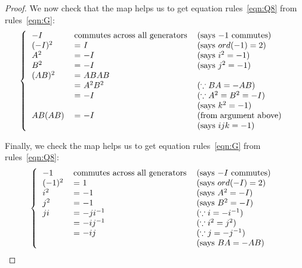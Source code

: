 \documentclass{article}
\begin{document}
\begin{enumerate}
\begin{enumerate}
\begin{proof}
          We now check that the map helps us to get equation
          rules~\ref{eqn:Q8} from rules~\ref{eqn:G}:
          \[\left \{
            \begin{tabular}{lll}
              $-I$      & commutes across all generators
                                        & (says $-1$ commutes) \\
              $(-I)^2$  & = $I$         & (says $ord(-1) = 2$) \\
              $A^2$     & = $-I$        & (says $i^2=-1$) \\
              $B^2$     & = $-I$        & (says $j^2=-1$) \\
              $(AB)^2$  & = $ABAB$      & \\
                        & = $A^2B^2$    & ($\because BA=-AB$) \\
                        & = $-I$        & ($\because A^2=B^2=-I$) \\
                        &               & (says $k^2=-1$) \\
              $AB(AB)$  & = $-I$        & (from argument above) \\
                        &               & (says $ijk=-1$) \\
            \end{tabular}
          \right .\ \]

          Finally, we check the map helps us to get equation
          rules~\ref{eqn:G} from rules~\ref{eqn:Q8}:
          \[\left \{
            \begin{tabular}{lll}
              $-1$      & commutes across all generators
                                        & (says $-I$ commutes) \\
              $(-1)^2$  & = $1$         & (says $ord(-I) = 2$) \\
              $i^2$     & = $-1$        & (says $A^2=-I$) \\
              $j^2$     & = $-1$        & (says $B^2=-I$) \\
              $ji$      & = $-ji^{-1}$  & ($\because i=-i^{-1}$) \\
                        & = $-ij^{-1}$  & ($\because i^2=j^2$) \\
                        & = $-ij$       & ($\because j=-j^{-1}$) \\
                        &               & (says $BA=-AB$) \\
            \end{tabular}
          \right .\ \]
        \end{proof}
    \end{enumerate}


\end{enumerate}
\end{document}
